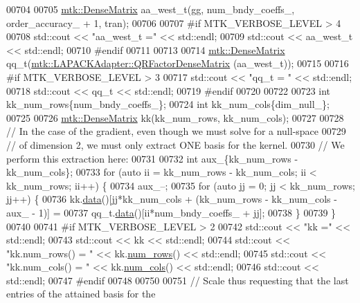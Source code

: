\begin{DoxyCode}
{{00704 
00705   \hyperlink{classmtk_1_1DenseMatrix}{mtk::DenseMatrix} aa\_west\_t(gg, num\_bndy\_coeffs\_, order\_accuracy\_ + 1, tran);
00706 
00707 \textcolor{preprocessor}{  #if MTK\_VERBOSE\_LEVEL > 4}
00708   std::cout << \textcolor{stringliteral}{"aa\_west\_t ="} << std::endl;
00709   std::cout << aa\_west\_t << std::endl;
00710 \textcolor{preprocessor}{  #endif}
00711 
00713 
00714   \hyperlink{classmtk_1_1DenseMatrix}{mtk::DenseMatrix} qq\_t(\hyperlink{classmtk_1_1LAPACKAdapter_ae5c6e78c9c819c9ac7a6f31bfd011d7a}{mtk::LAPACKAdapter::QRFactorDenseMatrix}
      (aa\_west\_t));
00715 
00716 \textcolor{preprocessor}{  #if MTK\_VERBOSE\_LEVEL > 3}
00717   std::cout << \textcolor{stringliteral}{"qq\_t = "} << std::endl;
00718   std::cout << qq\_t << std::endl;
00719 \textcolor{preprocessor}{  #endif}
00720 
00722 
00723   \textcolor{keywordtype}{int} kk\_num\_rows\{num\_bndy\_coeffs\_\};
00724   \textcolor{keywordtype}{int} kk\_num\_cols\{dim\_null\_\};
00725 
00726   \hyperlink{classmtk_1_1DenseMatrix}{mtk::DenseMatrix} kk(kk\_num\_rows, kk\_num\_cols);
00727 
00728   \textcolor{comment}{// In the case of the gradient, even though we must solve for a null-space}
00729   \textcolor{comment}{// of dimension 2, we must only extract ONE basis for the kernel.}
00730   \textcolor{comment}{// We perform this extraction here:}
00731 
00732   \textcolor{keywordtype}{int} aux\_\{kk\_num\_rows - kk\_num\_cols\};
00733   \textcolor{keywordflow}{for} (\textcolor{keyword}{auto} ii = kk\_num\_rows - kk\_num\_cols; ii < kk\_num\_rows; ii++) \{
00734     aux\_--;
00735     \textcolor{keywordflow}{for} (\textcolor{keyword}{auto} jj = 0; jj < kk\_num\_rows; jj++) \{
00736       kk.\hyperlink{classmtk_1_1DenseMatrix_a0c33b8a9e01d157c61ddbdf807c25d84}{data}()[jj*kk\_num\_cols + (kk\_num\_rows - kk\_num\_cols - aux\_ - 1)] =
00737         qq\_t.\hyperlink{classmtk_1_1DenseMatrix_a0c33b8a9e01d157c61ddbdf807c25d84}{data}()[ii*num\_bndy\_coeffs\_ + jj];
00738     \}
00739   \}
00740 
00741 \textcolor{preprocessor}{  #if MTK\_VERBOSE\_LEVEL > 2}
00742   std::cout << \textcolor{stringliteral}{"kk ="} << std::endl;
00743   std::cout << kk << std::endl;
00744   std::cout << \textcolor{stringliteral}{"kk.num\_rows() = "} << kk.\hyperlink{classmtk_1_1DenseMatrix_a53f3afb3b6a8d21854458aaa9663cc74}{num\_rows}() << std::endl;
00745   std::cout << \textcolor{stringliteral}{"kk.num\_cols() = "} << kk.\hyperlink{classmtk_1_1DenseMatrix_a41747502d468c6728a4be31501b16e0e}{num\_cols}() << std::endl;
00746   std::cout << std::endl;
00747 \textcolor{preprocessor}{  #endif}
00748 
00750 
00751   \textcolor{comment}{// Scale thus requesting that the last entries of the attained basis for the}
}}
\end{DoxyCode}
